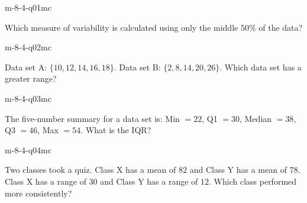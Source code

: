 

\begin{practiceQuestion}{m-8-4-q01}{mc}
\begin{questionText}
Which measure of variability is calculated using only the middle $50\%$ of the data?
\end{questionText}
\end{practiceQuestion}

\begin{practiceQuestion}{m-8-4-q02}{mc}
\begin{questionText}
Data set A: $\{10, 12, 14, 16, 18\}$. Data set B: $\{2, 8, 14, 20, 26\}$. Which data set has a greater range?
\end{questionText}
\end{practiceQuestion}

\begin{practiceQuestion}{m-8-4-q03}{mc}
\begin{questionText}
The five-number summary for a data set is: Min $= 22$, Q1 $= 30$, Median $= 38$, Q3 $= 46$, Max $= 54$. What is the IQR?
\end{questionText}
\end{practiceQuestion}

\begin{practiceQuestion}{m-8-4-q04}{mc}
\begin{questionText}
Two classes took a quiz. Class X has a mean of $82$ and Class Y has a mean of $78$. Class X has a range of $30$ and Class Y has a range of $12$. Which class performed more consistently?
\end{questionText}
\end{practiceQuestion}

